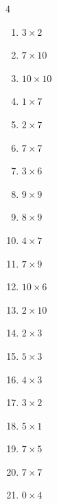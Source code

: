 \begin{multicols}{4}
\begin{enumerate}
  \item $3\times 2$
        \phantom{$=6$}

  \item $7\times 10$
        \phantom{$=70$}

  \item $10\times 10$
        \phantom{$=100$}

  \item $1\times 7$
        \phantom{$=7$}

  \item $2\times 7$
        \phantom{$=14$}

  \item $7\times 7$
        \phantom{$=49$}

  \item $3\times 6$
        \phantom{$=18$}

  \item $9\times 9$
        \phantom{$=81$}

  \item $8\times 9$
        \phantom{$=72$}

  \item $4\times 7$
        \phantom{$=28$}

  \item $7\times 9$
        \phantom{$=63$}

  \item $10\times 6$
        \phantom{$=60$}

  \item $2\times 10$
        \phantom{$=20$}

  \item $2\times 3$
        \phantom{$=6$}

  \item $5\times 3$
        \phantom{$=15$}

  \item $4\times 3$
        \phantom{$=12$}

  \item $3\times 2$
        \phantom{$=6$}

  \item $5\times 1$
        \phantom{$=5$}

  \item $7\times 5$
        \phantom{$=35$}

\columnbreak %

  \item $7\times 7$
        \phantom{$=49$}

  \item $0\times 4$
        \phantom{$=0$}


\end{enumerate}
\end{multicols}
